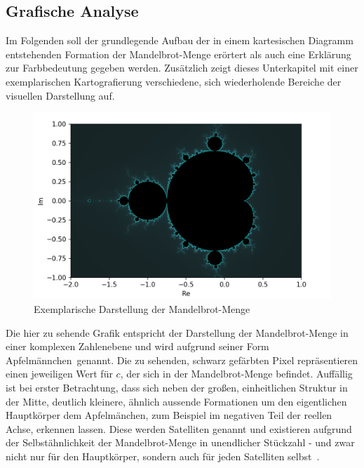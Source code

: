 \subsection{Grafische Analyse}\label{subsec:graphical-analysis}

Im Folgenden soll der grundlegende Aufbau der in einem kartesischen Diagramm
entstehenden Formation der Mandelbrot-Menge erörtert als auch eine
Erklärung zur Farbbedeutung gegeben werden.
Zusätzlich zeigt dieses Unterkapitel mit einer exemplarischen Kartografierung
verschiedene, sich wiederholende Bereiche der visuellen Darstellung auf.

\begin{figure}[h!]
  \centering
  \includegraphics[width=\textwidth]{images/mandelbrotImage}
  \caption[Caption for LOF]{
    Exemplarische Darstellung der Mandelbrot-Menge\footnotemark
  }
  \label{fig:mandelbrot-set}
\end{figure}

Die hier zu sehende Grafik entspricht der Darstellung der Mandelbrot-Menge
in einer komplexen Zahlenebene und wird aufgrund seiner Form
\glqq Apfelm\"annchen\grqq~genannt.
Die zu sehenden, schwarz gefärbten Pixel repräsentieren einen
jeweiligen Wert für $c$, der sich in der Mandelbrot-Menge befindet.
Auffällig ist bei erster Betrachtung, dass sich neben der großen,
einheitlichen Struktur in der Mitte,
deutlich kleinere, ähnlich aussende Formationen um den eigentlichen Hauptkörper
dem Apfelm\"anchen, zum Beispiel im negativen Teil der reellen Achse,
erkennen lassen.
Diese werden Satelliten genannt und existieren aufgrund der Selbstähnlichkeit
der Mandelbrot-Menge in unendlicher Stückzahl - und zwar nicht nur für den Hauptkörper,
sondern auch für jeden Satelliten selbst~\cite{lomonaco_quasi-conformal_2018}.

